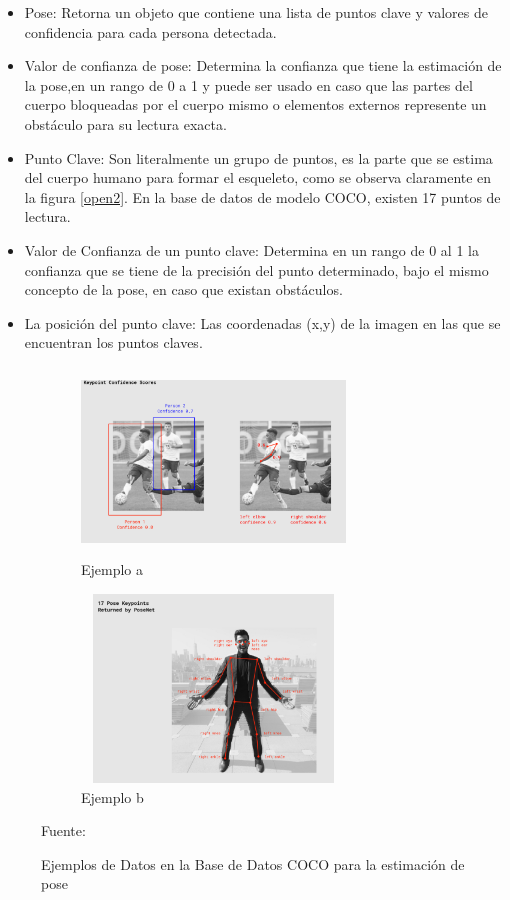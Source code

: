 \begin{itemize}
	\item Pose: Retorna un objeto que contiene una lista de puntos clave y valores de confidencia para cada persona detectada.
	\item Valor de confianza de pose: Determina la confianza que tiene la estimación de la pose,en un rango de 0 a 1 y puede ser usado en caso que las partes del cuerpo bloqueadas por el cuerpo mismo o elementos externos represente un obstáculo para su lectura exacta.
	\item Punto Clave: Son literalmente un grupo de puntos, es la parte que se estima del cuerpo humano para formar el esqueleto, como se observa claramente en la figura \ref{open2}. En la base de datos de modelo COCO, existen 17 puntos de lectura.
	\item Valor de Confianza de un punto clave: Determina en un rango de 0 al 1 la confianza que se tiene de la precisión del punto determinado, bajo el mismo concepto de la pose, en caso que existan obstáculos.
	\item La posición del punto clave: Las coordenadas (x,y) de la imagen en las que se encuentran los puntos claves.
\end{itemize}

\begin{figure}[ht]
	\centering
	\begin{subfigure}{.5\textwidth}
		\centering
		\includegraphics[width=7cm,height=5cm,]{./Images/posenetcocoexample.png}
		\caption{Ejemplo a}
		\label{posenet1}
	\end{subfigure}%
	\begin{subfigure}{.5\textwidth}
		\centering
		\includegraphics[width=7cm,height=5cm]{./Images/posenetexample2.png}
		\caption{Ejemplo b}
		\label{posenet2}
	\end{subfigure}
	\caption{Ejemplos de Datos en la Base de Datos COCO para la estimación de pose}
	\footnotesize Fuente: \cite{kendall2015posenet} \cite{oved2018real}
	\label{exampleposenet}
\end{figure}



